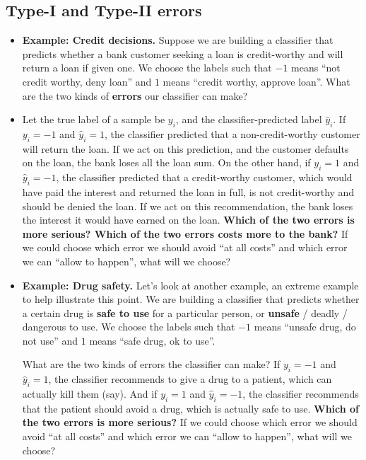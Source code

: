 \documentclass[11pt]{article}
\begin{document}
    \subsection{Type-I and Type-II errors}
    \begin{itemize}
      \item {\bf Example: Credit decisions.}
       Suppose we are building a classifier that predicts whether a bank customer
	seeking a loan is
	credit-worthy and will return a loan if given one.  
	We choose the labels such that $-1$ means
	``not credit worthy, deny loan'' and $1$ means  ``credit worthy, approve
	loan''. What are the
	two kinds of {\bf errors} our classifier can make? 

      \item  Let the true label of a sample be $y_i$, and the classifier-predicted label
	 $\hat{y}_i$. If $y_i=-1$ and $\hat{y}_i=1$, the classifier predicted that a
	 non-credit-worthy customer will return the loan. If we act on this
	 prediction, and the customer defaults on the loan, the bank loses all
	 the loan sum. On the other hand, if $y_i=1$ and $\hat{y}_i=-1$, the
	 classifier predicted that a credit-worthy customer, which would have
	 paid the interest and returned the loan in full, is not credit-worthy
	 and should be denied the loan. If we act on this recommendation, the
	 bank loses the interest it would have earned on the loan. {\bf Which of
	 the two errors is more serious? Which of the two errors costs more to
       the bank?} If we could choose which error we should avoid ``at all
       costs'' and which error we can ``allow to happen'', what will we choose?

     \item {\bf Example: Drug safety.} Let's look at another example, an extreme
	 example to help illustrate this point. We are building a classifier
	 that predicts whether a certain drug is {\bf safe to use} for a
	 particular person, or {\bf unsafe} / deadly / dangerous to use.
	We choose the labels such that $-1$ means
	``unsafe drug, do not use'' and $1$ means  ``safe drug, ok to use''. 

	What are the two kinds of errors the classifier can make? 
	If $y_i=-1$ and $\hat{y}_i=1$, the classifier recommends to give a drug
	to a patient, which can actually kill them (say). 
	And if $y_i=1$ and $\hat{y}_i=-1$, the classifier recommends that the
	patient should avoid a
	drug, which is actually safe to use. 
	{\bf Which of the two errors is more serious?}
	If we could choose which error we should avoid ``at all
       costs'' and which error we can ``allow to happen'', what will we choose?


\end{itemize}
\end{document}
